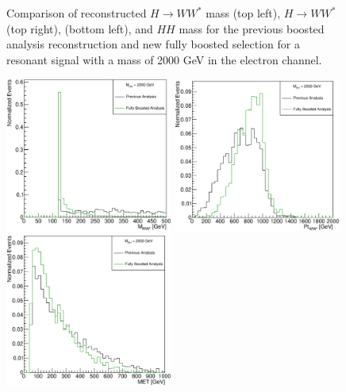 \begin{figure}[h!]
\begin{center}
\caption[Comparison of ${H\rightarrow WW^{*}}$ mass, ${H\rightarrow WW^{*}}$ \pt, \met , and $HH$ mass for the electron channel]{Comparison of reconstructed ${H\rightarrow WW^{*}}$ mass (top left), ${H\rightarrow WW^{*}}$ \pt (top right), \met (bottom left), and $HH$ mass for the  previous boosted analysis reconstruction and new fully boosted selection for a resonant signal with a mass of 2000 GeV in the electron channel.}
\label{fig:elec_sel}
\end{center}
\end{figure}

\newpage

\begin{figure}[h!]
\begin{center}
\includegraphics[width=0.49\textwidth]{figures/WHad_plots_john_withcuts/muon/hww_m_Xhh2000}
\includegraphics[width=0.49\textwidth]{figures/WHad_plots_john_withcuts/muon/hww_pt_Xhh2000}\\
\includegraphics[width=0.49\textwidth]{figures/WHad_plots_john_withcuts/muon/wlep_met_Xhh2000}

\end{center}
\end{figure}
